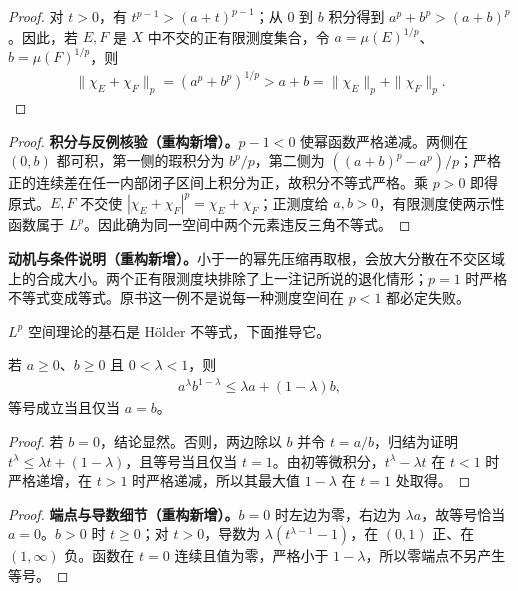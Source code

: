 \documentclass[../../main.tex]{subfiles}
\begin{document}
\begin{proof}
对 $t>0$，有 $t^{p-1}>(a+t)^{p-1}$；从 $0$ 到 $b$ 积分得到 $a^p+b^p>(a+b)^p$。因此，若 $E,F$ 是 $X$ 中不交的正有限测度集合，令 $a=\mu(E)^{1/p}$、$b=\mu(F)^{1/p}$，则
\begin{align*}
\|\chi_E+\chi_F\|_p=(a^p+b^p)^{1/p}>a+b=\|\chi_E\|_p+\|\chi_F\|_p.
\end{align*}
\end{proof}
\begin{proof}
\textbf{积分与反例核验（重构新增）。}$p-1<0$ 使幂函数严格递减。两侧在 $(0,b)$ 都可积，第一侧的瑕积分为 $b^p/p$，第二侧为 $((a+b)^p-a^p)/p$；严格正的连续差在任一内部闭子区间上积分为正，故积分不等式严格。乘 $p>0$ 即得原式。$E,F$ 不交使 $|\chi_E+\chi_F|^p=\chi_E+\chi_F$；正测度给 $a,b>0$，有限测度使两示性函数属于 $L^p$。因此确为同一空间中两个元素违反三角不等式。
\end{proof}
\begin{remark}
\textbf{动机与条件说明（重构新增）。}小于一的幂先压缩再取根，会放大分散在不交区域上的合成大小。两个正有限测度块排除了上一注记所说的退化情形；$p=1$ 时严格不等式变成等式。原书这一例不是说每一种测度空间在 $p<1$ 都必定失败。
\end{remark}
$L^p$ 空间理论的基石是 Hölder 不等式，下面推导它。
\begin{lemma}\label{lemma:ch06-weighted-arithmetic-geometric}
若 $a\geqslant0$、$b\geqslant0$ 且 $0<\lambda<1$，则
\begin{align*}
a^\lambda b^{1-\lambda}\leqslant\lambda a+(1-\lambda)b,
\end{align*}
等号成立当且仅当 $a=b$。
\end{lemma}
\begin{proof}
若 $b=0$，结论显然。否则，两边除以 $b$ 并令 $t=a/b$，归结为证明 $t^\lambda\leqslant\lambda t+(1-\lambda)$，且等号当且仅当 $t=1$。由初等微积分，$t^\lambda-\lambda t$ 在 $t<1$ 时严格递增，在 $t>1$ 时严格递减，所以其最大值 $1-\lambda$ 在 $t=1$ 处取得。
\end{proof}
\begin{proof}
\textbf{端点与导数细节（重构新增）。}$b=0$ 时左边为零，右边为 $\lambda a$，故等号恰当 $a=0$。$b>0$ 时 $t\geqslant0$；对 $t>0$，导数为 $\lambda(t^{\lambda-1}-1)$，在 $(0,1)$ 正、在 $(1,\infty)$ 负。函数在 $t=0$ 连续且值为零，严格小于 $1-\lambda$，所以零端点不另产生等号。
\end{proof}
\end{document}
